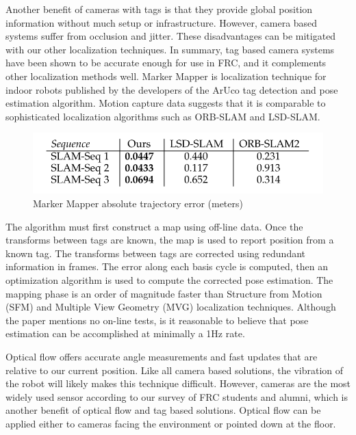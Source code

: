 \documentclass{article}
\begin{document}
  Another benefit of cameras with tags is that they provide global position information without much setup or infrastructure. However, camera based systems suffer from occlusion and jitter. These disadvantages can be mitigated with our other localization techniques. In summary, tag based camera systems have been shown to be accurate enough for use in FRC, and it complements other localization methods well.
  Marker Mapper is localization technique for indoor robots published by the developers of the ArUco tag detection and pose estimation algorithm. Motion capture data suggests that it is comparable to sophisticated localization algorithms such as ORB-SLAM and LSD-SLAM\cite{munoz-salinas_rafael_mapping_2016}.

  \begin{figure}[H]
  	\centering
    \includegraphics[width=0.5\linewidth]{./images/mm_errors.png}
    \caption{Marker Mapper absolute trajectory error (meters)}
    \label{fig:mmResults}
  \end{figure}

  The algorithm must first construct a map using off-line data. Once the transforms between tags are known, the map is used to report position from a known tag. The transforms between tags are corrected using redundant information in frames. The error along each basis cycle is computed, then an optimization algorithm is used to compute the corrected pose estimation. The mapping phase is an order of magnitude faster than Structure from Motion (SFM) and Multiple View Geometry (MVG) localization techniques. Although the paper mentions no on-line tests, is it reasonable to believe that pose estimation can be accomplished at minimally a 1Hz rate.

  Optical flow offers accurate angle measurements and fast updates that are relative to our current position. Like all camera based solutions, the vibration of the robot will likely makes this technique difficult. However, cameras are the most widely used sensor according to our survey of FRC students and alumni, which is another benefit of optical flow and tag based solutions. Optical flow can be applied either to cameras facing the environment or pointed down at the floor.
\end{document}

